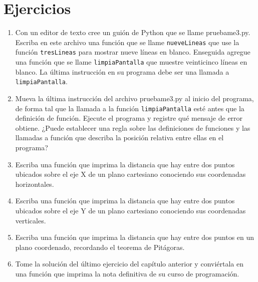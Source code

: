 \begin{description}
  
   
  
  
 
\end{description}

\section{Ejercicios}
\begin{enumerate}
\item Con un editor de texto cree un guión de Python que se llame pruebame3.py.
Escriba en este archivo una función que se llame \verb+nueveLineas+
que use la función \verb+tresLineas+ para mostrar nueve líneas en
blanco. Enseguida agregue una función que se llame \verb+limpiaPantalla+
que muestre veinticinco líneas en blanco. La última instrucción en
su programa debe ser una llamada a \verb+limpiaPantalla+.
\item Mueva la última instrucción del archivo pruebame3.py al inicio del
programa, de forma tal que la llamada a la función \verb+limpiaPantalla+
esté antes que la definición de función. Ejecute el programa y registre
qué mensaje de error obtiene. ¿Puede establecer una regla sobre las
definiciones de funciones y las llamadas a función que describa la
posición relativa entre ellas en el programa?
\item Escriba una función que imprima la distancia que hay entre dos puntos
ubicados sobre el eje X de un plano cartesiano conociendo sus coordenadas
horizontales.
\item Escriba una función que imprima la distancia que hay entre dos puntos
ubicados sobre el eje Y de un plano cartesiano conociendo sus coordenadas
verticales.
\item Escriba una función que imprima la distancia que hay entre dos puntos
en un plano coordenado, recordando el teorema de Pitágoras.
\item Tome la solución del último ejercicio del capítulo anterior y conviértala
en una función que imprima la nota definitiva de su curso de programación.
\end{enumerate}

